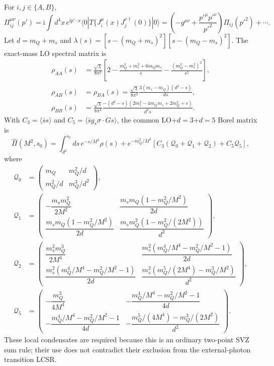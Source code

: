 \documentclass[11pt]{article}
\newcommand{\ii}{\mathrm{i}}
\newcommand{\ssbar}{\langle\bar s s\rangle}
\begin{document}
For $i,j\in\{A,B\}$,
\begin{equation}
 \Pi_{ij}^{\mu\nu}(p')=\ii\int d^4x\,e^{\ii p'\cdot x}
 \langle0|T\{J_i^\mu(x)J_j^{\nu\dagger}(0)\}|0\rangle
 =\left(-g^{\mu\nu}+\frac{p'^\mu p'^\nu}{p'^2}\right)
 \Pi_{ij}(p'^2)+\cdots .
\end{equation}
Let $d=m_Q+m_s$ and
$\lambda(s)=[s-(m_Q+m_s)^2][s-(m_Q-m_s)^2]$.  The exact-mass LO spectral
matrix is
\begin{align}
 \rho_{AA}(s)&=\frac{\sqrt\lambda}{8\pi^2}\left[
 2-\frac{m_Q^2+m_s^2+6m_Qm_s}{s}
 -\frac{(m_Q^2-m_s^2)^2}{s^2}\right],\nonumber\\
 \rho_{AB}(s)&=\rho_{BA}(s)=\frac{\sqrt\lambda}{8\pi^2}
 \frac{3(m_s-m_Q)(d^2-s)}{ds},\nonumber\\
 \rho_{BB}(s)&=\frac{\sqrt\lambda}{8\pi^2}
 \frac{-(d^2-s)(2m_s^2-4m_Qm_s+2m_Q^2+s)}{d^2s}.
 \label{eq:app-two-point-rho}
\end{align}
With $C_3=\ssbar$ and
$C_5=\langle\bar s g_s\sigma\!\cdot\!G s\rangle$, the common
LO+$d=3$+$d=5$ Borel matrix is
\begin{equation}
 \widehat\Pi(M^2,s_0)=
 \int_{d^2}^{s_0}ds\,e^{-s/M^2}\rho(s)
 +e^{-m_Q^2/M^2}
 [C_3(\mathcal Q_0+\mathcal Q_1+\mathcal Q_2)+C_5\mathcal Q_5],
 \label{eq:app-two-point-matrix}
\end{equation}
where
\begin{align}
 \mathcal Q_0&=
 \begin{pmatrix}m_Q&m_Q^2/d\\m_Q^2/d&m_Q^3/d^2\end{pmatrix},\nonumber\\
 \mathcal Q_1&=
 \begin{pmatrix}
 -\dfrac{m_sm_Q^2}{2M^2}&
 \dfrac{m_sm_Q(1-m_Q^2/M^2)}{2d}\\
 \dfrac{m_sm_Q(1-m_Q^2/M^2)}{2d}&
 \dfrac{m_sm_Q^2(1-m_Q^2/(2M^2))}{d^2}
 \end{pmatrix},\nonumber\\
 \mathcal Q_2&=
 \begin{pmatrix}
 \dfrac{m_s^2m_Q^3}{2M^4}&
 \dfrac{m_s^2(m_Q^4/M^4-m_Q^2/M^2-1)}{2d}\\
 \dfrac{m_s^2(m_Q^4/M^4-m_Q^2/M^2-1)}{2d}&
 \dfrac{m_s^2(m_Q^5/(2M^4)-m_Q^3/M^2)}{d^2}
 \end{pmatrix},\nonumber\\
 \mathcal Q_5&=
 \begin{pmatrix}
 -\dfrac{m_Q^3}{4M^4}&
 -\dfrac{m_Q^4/M^4-m_Q^2/M^2-1}{4d}\\
 -\dfrac{m_Q^4/M^4-m_Q^2/M^2-1}{4d}&
 -\dfrac{m_Q^5/(4M^4)-m_Q^3/(2M^2)}{d^2}
 \end{pmatrix}.
 \label{eq:app-q-matrices}
\end{align}
These local condensates are required because this is an ordinary two-point
SVZ sum rule; their use does not contradict their exclusion from the
external-photon transition LCSR.
\end{document}
